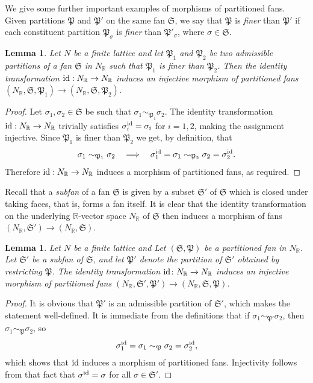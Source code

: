 \documentclass[10pt,twoside, a4paper,reqno]{amsart}
\newcommand{\Pfrak}{\mathfrak{P}}
\newcommand{\R}{\mathbb{R}}
\newcommand{\Sfan}{\mathfrak{S}}
\newtheorem{lemma}[theorem]{Lemma}
\theoremstyle{definition}
\begin{document}
{We} give some further important examples of morphisms of partitioned fans. Given partitions $\Pfrak$ and $\Pfrak'$ on the same fan $\Sfan$, we say that $\Pfrak$ is \textit{finer} than $\Pfrak'$ if each constituent partition $\Pfrak_{\sigma}$ is \textit{finer} than $\Pfrak'_{\sigma}$, where $\sigma\in \Sfan$.

\begin{lemma}\label{lem:finerpartmorph}
    Let $N$ be a finite lattice and let $\Pfrak_1$ and $\Pfrak_2$ be two {admissible} partitions of a fan $\Sfan$ in $N_\R$ such that $\Pfrak_1$ is finer than $\Pfrak_2$. Then the identity transformation $\textnormal{id}: N_\R \to N_\R$ induces an injective morphism of partitioned fans $(N_\R, \Sfan, \Pfrak_1) \to (N_\R, \Sfan, \Pfrak_2)$. 
\end{lemma}
\begin{proof}
    Let $\sigma_1, \sigma_2 \in \Sfan$ be such that $\sigma_1 \sim_{\Pfrak_1} \sigma_2$. The identity transformation $\textnormal{id}: N_\R \to N_\R$ trivially satisfies $\sigma_i^{\textnormal{id}} = \sigma_i$ for $i=1,2${, making {the assignment} injective}. Since $\Pfrak_1$ is finer than $\Pfrak_2$ we get, by definition, that
    \[ \sigma_1 \sim_{\Pfrak_1} \sigma_2 \quad \Longrightarrow \quad \sigma_1^{\textnormal{id}} = \sigma_1 \sim_{\Pfrak_2} \sigma_2 = \sigma_2^{\textnormal{id}}.\]
    Therefore $\textnormal{id}: N_\R \to N_\R$ induces a morphism of partitioned fans, as required. 
\end{proof}

Recall that a \textit{subfan} of a fan $\Sfan$ is given by a subset $\Sfan'$ of $\Sfan$ which is closed under taking faces, that is, forms a fan itself. It is clear that the identity transformation on the underlying $\R$-vector space $N_\R$ of $\Sfan$ then induces a morphism of fans $(N_\R, \Sfan') \to (N_\R,\Sfan)$. 

\begin{lemma}\label{lem:subpartmorph}
    Let $N$ be a finite lattice and Let $(\Sfan,\Pfrak)$ be a partitioned fan in $N_\R$. Let $\Sfan'$ be a subfan of $\Sfan$, and let $\Pfrak'$ denote {the} partition of $\Sfan'$ obtained by restricting $\Pfrak$.
    The identity transformation $\textnormal{id}\colon N_\R\xrightarrow{} N_\R$ induces an injective morphism of partitioned fans 
    $(N_\R, \Sfan',\Pfrak') \xrightarrow{} (N_\R, \Sfan,\Pfrak)$.
\end{lemma}
\begin{proof}
    {It is obvious that $\Pfrak'$ is an admissible partition of $\Sfan'$, which makes the statement well-defined.} It is immediate from the definitions that if $\sigma_1 \sim_{\Pfrak'} \sigma_2$, then $\sigma_1 \sim_{\Pfrak} \sigma_2$, so
    \begin{equation*}
        \sigma_1^{\textnormal{id}} = \sigma_1 \sim_{\Pfrak} \sigma_2 = \sigma_2^{\textnormal{id}},
    \end{equation*}
    which shows {that} $\textnormal{id}$ induce{s} a morphism of partitioned fans. Injectivity follows from that fact that $\sigma^{\textnormal{id}}=\sigma$ for all $\sigma\in\Sfan'$. 
\end{proof}
\end{document}
